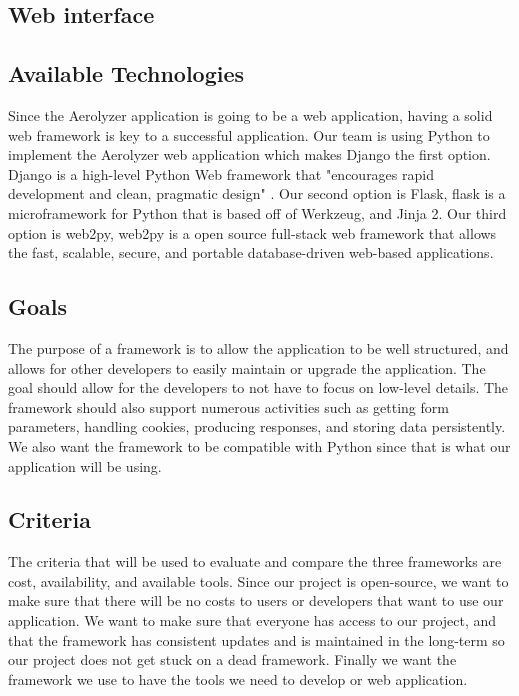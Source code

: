 \documentclass[onecolumn, draftclsnofoot,10pt, compsoc]{IEEEtran}
\begin{document}
\begin{flushleft}
\section{Web interface}
\subsection{Available Technologies}
Since the Aerolyzer application is going to be a web application, having a solid web framework is  key to a successful application. Our team is using Python to implement the Aerolyzer web application which makes Django the first option. Django is a high-level Python Web framework that "encourages rapid development and clean, pragmatic design" \cite{10}. Our second option is Flask, flask is a microframework for Python that is based off of Werkzeug, and Jinja 2\cite{11}. Our third option is web2py, web2py is a open source full-stack web framework that allows the fast, scalable, secure, and portable database-driven web-based applications\cite{12}.


 


\subsection{Goals}
The purpose of a framework is to allow the application to be well structured, and allows for other developers to easily maintain or upgrade the application. The goal should allow for the developers to not have to focus on low-level details. The framework should also support numerous activities such as getting form parameters, handling cookies, producing responses, and storing data persistently\cite{13}. We also want the framework to be compatible with Python since that is what our application will be using. 





\subsection{Criteria}
The criteria that will be used to evaluate and compare the three frameworks are cost, availability, and available tools. Since our project is open-source, we want to make sure that there will be no costs to users or developers that want to use our application. We want to make sure that everyone has access to our project, and that the framework has consistent updates and is maintained in the long-term so our project does not get stuck on a dead framework. Finally we want the framework we use to have the tools we need to develop or web application.



\end{flushleft}
\end{document}
